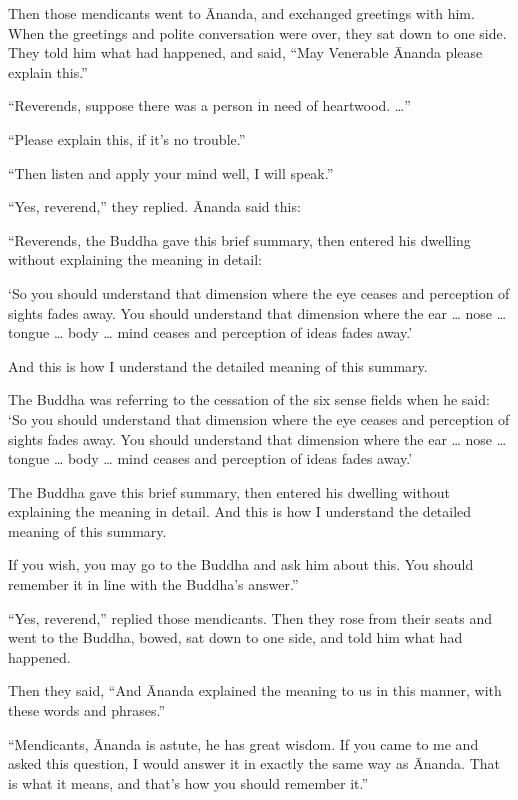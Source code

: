 \documentclass[12pt,openany]{book}%
\begin{document}
Then those mendicants went to Ānanda, and exchanged greetings with him. When the greetings and polite conversation were over, they sat down to one side. They told him what had happened, and said, “May Venerable Ānanda please explain this.” 

“Reverends, suppose there was a person in need of heartwood. …” 

“Please explain this, if it’s no trouble.” 

“Then listen and apply your mind well, I will speak.” 

“Yes, reverend,” they replied. Ānanda said this: 

“Reverends, the Buddha gave this brief summary, then entered his dwelling without explaining the meaning in detail: 

‘So you should understand that dimension where the eye ceases and perception of sights fades away. You should understand that dimension where the ear … nose … tongue … body … mind ceases and perception of ideas fades away.’ 

And this is how I understand the detailed meaning of this summary. 

The Buddha was referring to the cessation of the six sense fields when he said: ‘So you should understand that dimension where the eye ceases and perception of sights fades away. You should understand that dimension where the ear … nose … tongue … body … mind ceases and perception of ideas fades away.’ 

The Buddha gave this brief summary, then entered his dwelling without explaining the meaning in detail. And this is how I understand the detailed meaning of this summary. 

If you wish, you may go to the Buddha and ask him about this. You should remember it in line with the Buddha’s answer.” 

“Yes, reverend,” replied those mendicants. Then they rose from their seats and went to the Buddha, bowed, sat down to one side, and told him what had happened. 

Then they said, “And Ānanda explained the meaning to us in this manner, with these words and phrases.” 

“Mendicants, Ānanda is astute, he has great wisdom. If you came to me and asked this question, I would answer it in exactly the same way as Ānanda. That is what it means, and that’s how you should remember it.” 
\end{document}
